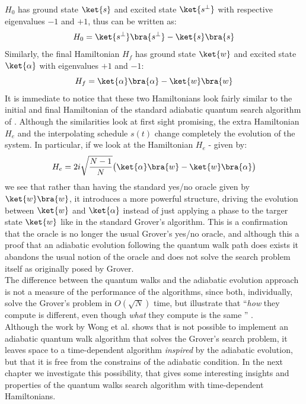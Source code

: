 $H_0$ has ground state $\ket{s}$ and excited state $\ket{s^\perp}$ with respective eigenvalues $-1$ and $+1$, thus can be written as:
\begin{equation}
  H_0  = \ket{s^\perp}\bra{s^\perp} - \ket{s}\bra{s}
\end{equation}
Similarly, the final Hamiltonian $H_f$ has ground state $\ket{w}$ and excited state $\ket{\alpha}$ with eigenvalues $+1$ and $-1$:
\begin{equation}
  H_f =  \ket{\alpha}\bra{\alpha} - \ket{w}\bra{w}
\end{equation}
It is immediate to notice that these two Hamiltonians look fairly similar to the initial and final Hamiltonian of the standard adiabatic quantum search algorithm of . Although the similarities look at first sight promising, the extra Hamiltonian $H_e$ and the interpolating schedule $s(t)$ change completely the evolution of the system. In particular, if we look at the Hamiltonian $H_e$ - given by:
\begin{equation}
  H_e = 2i\sqrt{\frac{N-1}{N}}\big(\ket{\alpha}\bra{w} - \ket{w}\bra{\alpha}\big)
\end{equation}
we see that rather than having the standard yes/no oracle given by $\ket{w}\bra{w}$, it introduces a more powerful structure, driving the evolution between $\ket{w}$ and $\ket{\alpha}$ instead of just applying a phase to the targer state $\ket{w}$ like in the standard Grover's algorithm. This is a confirmation that the oracle is no longer the usual Grover's yes/no oracle, and although this a proof that an adiabatic evolution following the quantum walk path does exists it abandons the usual notion of the oracle and does not solve the search problem itself as originally posed by Grover. \\

\noindent
The difference between the quantum walks and the adiabatic evolution approach is not a measure of the performance of the algorithms, since both, individually, solve the Grover's problem in $O(\sqrt{N})$ time, but illustrate that ``\textit{how} they compute is different, even though \textit{what} they compute is the same '' \cite{Wong2016}.\\

\noindent
Although the work by Wong et al. shows that is not possible to implement an adiabatic quantum walk algorithm that solves the Grover's search problem, it leaves space to a time-dependent algorithm \textit{inspired} by the adiabatic evolution, but that it is free from the constrains of the adiabatic condition. In the next chapter we investigate this possibility, that gives some interesting insights and properties of the quantum walks search algorithm with time-dependent Hamiltonians.
